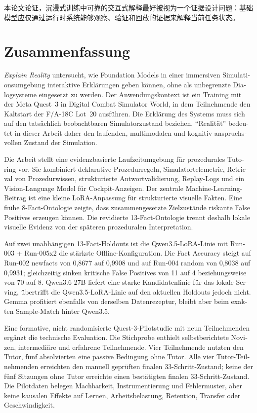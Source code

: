 本论文论证，沉浸式训练中可靠的交互式解释最好被视为一个证据设计问题：基础模型应仅通过运行时系统能够观察、验证和回放的证据来解释当前任务状态。

\newpage
\chapter*{Zusammenfassung}

\begin{otherlanguage}{ngerman}
\emph{Explain Reality} untersucht, wie Foundation Models in einer immersiven
Simulationsumgebung interaktive Erkl\"arungen geben k\"onnen, ohne als
unbegrenzte Dialogsysteme eingesetzt zu werden. Der Anwendungskontext ist ein
Training mit der Meta Quest~3 in Digital Combat Simulator World, in dem
Teilnehmende den Kaltstart der F/A-18C Lot~20 ausf\"uhren. Die Erkl\"arung des
Systems muss sich auf den tats\"achlich beobachtbaren Simulatorzustand
beziehen. ``Realit\"at'' bedeutet in dieser Arbeit daher den laufenden,
multimodalen und kognitiv anspruchsvollen Zustand der Simulation.

Die Arbeit stellt eine evidenzbasierte Laufzeitumgebung f\"ur
prozedurales Tutoring vor. Sie kombiniert deklarative Prozedurregeln,
Simulatortelemetrie, Retrieval von Prozedurwissen, strukturierte Antwortvalidierung,
Replay-Logs und ein Vision-Language Model f\"ur Cockpit-Anzeigen. Der zentrale
Machine-Learning-Beitrag ist eine kleine LoRA-Anpassung f\"ur strukturierte
visuelle Fakten. Eine fr\"uhe 8-Fact-Ontologie zeigte, dass zusammengesetzte
Zielzust\"ande riskante False Positives erzeugen k\"onnen. Die revidierte
13-Fact-Ontologie trennt deshalb lokale visuelle Evidenz von der sp\"ateren
prozeduralen Interpretation.

Auf zwei unabh\"angigen 13-Fact-Holdouts ist die Qwen3.5-LoRA-Linie mit
Run-003 + Run-005x2 die st\"arkste Offline-Konfiguration. Die Fact Accuracy
steigt auf Run-002 newfacts von 0,8677 auf 0,9908 und auf Run-004 random von
0,8038 auf 0,9931; gleichzeitig sinken kritische False Positives von 11 auf 4
beziehungsweise von 70 auf 8. Qwen3.6-27B liefert eine starke
Kandidatenlinie f\"ur das lokale Serving, \"ubertrifft die Qwen3.5-LoRA-Linie
auf den aktuellen Holdouts jedoch nicht. Gemma profitiert ebenfalls von
derselben Datenrezeptur, bleibt aber beim exakten Sample-Match hinter Qwen3.5.

Eine formative, nicht randomisierte Quest-3-Pilotstudie mit neun Teilnehmenden
erg\"anzt die technische Evaluation. Die Stichprobe enthielt selbstberichtete
Novizen, intermedi\"are und erfahrene Teilnehmende. Vier Teilnehmende nutzten
den Tutor, f\"unf absolvierten eine passive Bedingung ohne Tutor. Alle vier
Tutor-Teilnehmenden erreichten den manuell gepr\"uften finalen
33-Schritt-Zustand; keine der f\"unf Sitzungen ohne Tutor erreichte einen
best\"atigten finalen 33-Schritt-Zustand. Die
Pilotdaten belegen Machbarkeit, Instrumentierung und Fehlermuster, aber keine
kausalen Effekte auf Lernen, Arbeitsbelastung, Retention, Transfer oder
Geschwindigkeit.
\end{otherlanguage}
